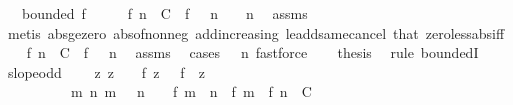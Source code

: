\begin{isabellebody}
\ \ \ {\isachardoublequoteopen}bounded\ f{\isachardoublequoteclose}\isanewline
%
\isadelimproof
%
\endisadelimproof
%
\isatagproof
{}\isamarkupfalse%
\ {\isacharminus}{\kern0pt}\isanewline
\ \ \isamarkupfalse%
\ {\isachardoublequoteopen}{\isasymbar}f\ n{\isasymbar}\ {\isasymle}\ C\ {\isacharplus}{\kern0pt}\ {\isasymbar}f\ {}{\isasymbar}{\isachardoublequoteclose}\ \ {\isachardoublequoteopen}n\ {\isasymge}\ {}{\isachardoublequoteclose}\ \ n\ \isamarkupfalse%
\ assms\ \isamarkupfalse%
\ {\isacharparenleft}{\kern0pt}metis\ abs{\isacharunderscore}{\kern0pt}ge{\isacharunderscore}{\kern0pt}zero\ abs{\isacharunderscore}{\kern0pt}of{\isacharunderscore}{\kern0pt}nonneg\ add{\isacharunderscore}{\kern0pt}increasing{}\ le{\isacharunderscore}{\kern0pt}add{\isacharunderscore}{\kern0pt}same{\isacharunderscore}{\kern0pt}cancel{}\ that\ zero{\isacharunderscore}{\kern0pt}less{\isacharunderscore}{\kern0pt}abs{\isacharunderscore}{\kern0pt}iff{\isacharparenright}{\kern0pt}\isanewline
\ \ \isamarkupfalse%
\ {\isachardoublequoteopen}{\isasymbar}f\ n{\isasymbar}\ {\isasymle}\ C\ {\isacharplus}{\kern0pt}\ {\isasymbar}f\ {}{\isasymbar}{\isachardoublequoteclose}\ \ n\ \isamarkupfalse%
\ assms\ \isamarkupfalse%
\ {\isacharparenleft}{\kern0pt}cases\ {\isachardoublequoteopen}{}\ {\isasymle}\ n{\isachardoublequoteclose}{\isacharparenright}{\kern0pt}\ fastforce{\isacharplus}{\kern0pt}\isanewline
\ \ \isamarkupfalse%
\ {\isacharquery}{\kern0pt}thesis\ \isamarkupfalse%
\ {\isacharparenleft}{\kern0pt}rule\ boundedI{\isacharparenright}{\kern0pt}\isanewline
{}\isamarkupfalse%
%
\endisatagproof
{\isafoldproof}%
%
\isadelimproof
\isanewline
%
\endisadelimproof
\isanewline
{}\isamarkupfalse%
\ slope{\isacharunderscore}{\kern0pt}odd{\isacharcolon}{\kern0pt}\ \isanewline
\ \ \ {\isachardoublequoteopen}{\isasymAnd}z{\isachardot}{\kern0pt}\ z\ {\isacharless}{\kern0pt}\ {}\ {\isasymLongrightarrow}\ f\ z\ {\isacharequal}{\kern0pt}\ {\isacharminus}{\kern0pt}\ f\ {\isacharparenleft}{\kern0pt}{\isacharminus}{\kern0pt}\ z{\isacharparenright}{\kern0pt}{\isachardoublequoteclose}\ \isanewline
\ \ \ \ \ \ \ \ \ \ {\isachardoublequoteopen}{\isasymAnd}m\ n{\isachardot}{\kern0pt}\ {\isasymlbrakk}m\ {\isachargreater}{\kern0pt}\ {}{\isacharsemicolon}{\kern0pt}\ n\ {\isachargreater}{\kern0pt}\ {}{\isasymrbrakk}\ {\isasymLongrightarrow}\ {\isasymbar}f\ {\isacharparenleft}{\kern0pt}m\ {\isacharplus}{\kern0pt}\ n{\isacharparenright}{\kern0pt}\ {\isacharminus}{\kern0pt}\ {\isacharparenleft}{\kern0pt}f\ m\ {\isacharplus}{\kern0pt}\ f\ n{\isacharparenright}{\kern0pt}{\isasymbar}\ {\isasymle}\ C{\isachardoublequoteclose}\isanewline

\end{isabellebody}
